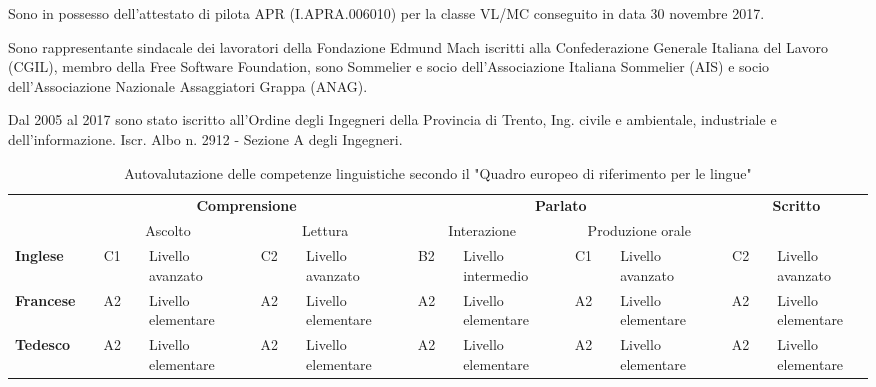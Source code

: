 \documentclass{curriculum}
\begin{document}
        Sono in possesso dell'attestato di pilota APR (I.APRA.006010) per la classe VL/MC conseguito in data 30 novembre 2017.
        
        Sono rappresentante sindacale dei lavoratori della Fondazione Edmund Mach iscritti alla Confederazione Generale Italiana del Lavoro (CGIL), membro della Free Software Foundation, sono Sommelier e socio dell'Associazione Italiana Sommelier (AIS) e socio dell'Associazione Nazionale Assaggiatori Grappa (ANAG).
        
        Dal 2005 al 2017 sono stato iscritto all'Ordine degli Ingegneri della Provincia di Trento, Ing. civile e ambientale, industriale e dell'informazione. Iscr. Albo n. 2912 - Sezione A degli Ingegneri. 
        
        \begin{table}[h]
        \centering
        \fontsize{9}{10}\selectfont
            \begin{tabular}{l c c c l c c c l c c c l c c c l c c c l}
                \toprule
                & & \multicolumn{7}{c}{\textbf{Comprensione}} & & \multicolumn{7}{c}{\textbf{Parlato}} & & \multicolumn{3}{c}{\textbf{Scritto}}\\
                & & \multicolumn{3}{c}{Ascolto} & &\multicolumn{3}{c}{Lettura} & & \multicolumn{3}{c}{Interazione} & &\multicolumn{3}{c}{Produzione orale}  & & \multicolumn{3}{c}{}\\
                \cmidrule{3-9} \cmidrule{11-17} \cmidrule{19-21}
                \textbf{Inglese} & \phantom{abc} & C1 & \phantom{a} & Livello avanzato & \phantom{ab} & C2 & \phantom{a} & Livello avanzato & \phantom{ab} & B2 & \phantom{a} & Livello intermedio & \phantom{ab} & C1 & \phantom{a} & Livello avanzato & \phantom{ab} & C2 & \phantom{a} & Livello avanzato\\
                \textbf{Francese} & \phantom{abc} & A2 & \phantom{a} & Livello elementare & \phantom{ab} & A2 & \phantom{a} & Livello elementare & \phantom{ab} & A2 & \phantom{a} & Livello elementare & \phantom{ab} & A2 & \phantom{a} & Livello elementare & \phantom{ab} & A2 & \phantom{a} & Livello elementare\\
                \textbf{Tedesco}  & \phantom{abc} & A2 & \phantom{a} & Livello elementare & \phantom{ab} & A2 & \phantom{a} & Livello elementare & \phantom{ab} & A2 & \phantom{a} & Livello elementare & \phantom{ab} & A2 & \phantom{a} & Livello elementare & \phantom{ab} & A2 & \phantom{a} & Livello elementare\\
                \bottomrule
            \end{tabular}
            \caption*{\small Autovalutazione delle competenze linguistiche secondo il "Quadro europeo di riferimento per le lingue"}
        \end{table}
\end{document}
